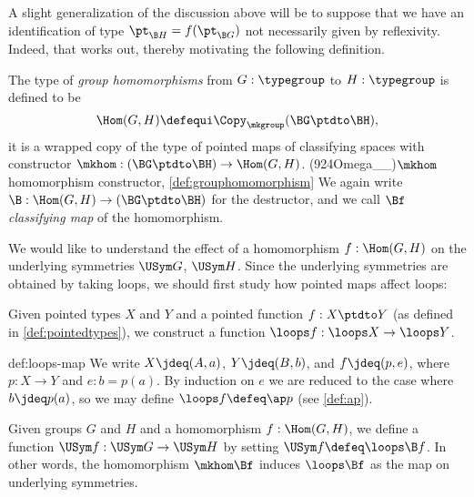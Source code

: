A slight generalization of the discussion above will be to suppose that we have an identification of type $\pt_{\B H} = f ( \pt_{\B G} ) $ not
necessarily given by reflexivity.  Indeed, that works out, thereby motivating the following definition.

\begin{definition}\label{def:grouphomomorphism}
  The type of \emph{group homomorphisms} from $G:\typegroup$ to
  $H:\typegroup$ is defined to be
  \[
    \Hom(G,H)\defequi\Copy_{\mkgroup}(\BG\ptdto\BH),
  \]
  \ie it is a wrapped copy of the type of pointed maps of classifying spaces
  with constructor
  $\mkhom : (\BG \ptdto \BH) \to \Hom(G,H)$.%
  \glossary(924Omega__){$\protect\mkhom$}{homomorphism constructor, \cref{def:grouphomomorphism}}
  We again write $\B : \Hom(G,H) \to (\BG \ptdto \BH)$ for the destructor,
  and we call $\Bf$ \emph{classifying map} of the homomorphism.
\end{definition}

We would like to understand the effect of a homomorphism $f : \Hom(G,H)$
on the underlying symmetries $\USym G$, $\USym H$.
Since the underlying symmetries are obtained by taking loops,
we should first study how pointed maps affect loops:

\begin{construction}\label{def:loops-map}
  Given pointed types $X$ and $Y$ and a pointed function $f : X\ptdto Y$ (as defined in \cref{def:pointedtypes}),
  we construct a function $\loops f : \loops X \to \loops Y$.
\end{construction}

\begin{implementation}{def:loops-map}
  We write $X \jdeq (A,a)$, $Y \jdeq (B,b)$, and $f \jdeq (p,e)$, where $p : X \to Y$ and $e : b = p(a)$.
  By induction on $e$ we are reduced to the case where $b \jdeq p(a)$, so we may define $\loops f \defeq \ap p$
  (see \cref{def:ap}).
\end{implementation}

\begin{definition}\label{def:USym-hom}
  Given groups $G$ and $H$ and a homomorphism $f : \Hom(G,H)$, we define a function $\USym f : \USym G \to \USym H$
  by setting $\USym f \defeq \loops \B f$.
  In other words, the homomorphism $\mkhom\Bf$
  induces $\loops\Bf$ as the map on underlying symmetries.
\end{definition}


